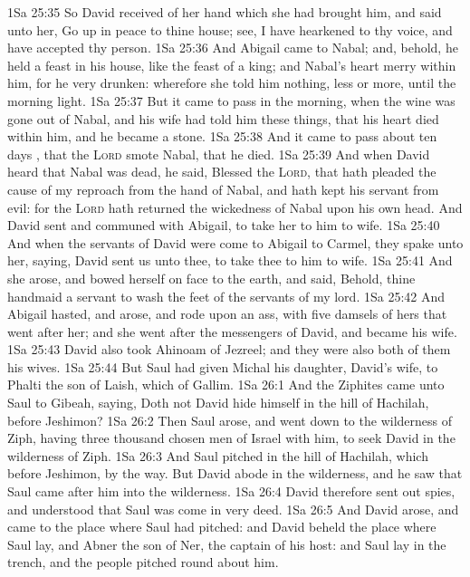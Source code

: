 \vs 1Sa 25:35 So David received of her hand  which she had brought him, and said unto her, Go up in peace to thine house; see, I have hearkened to thy voice, and have accepted thy person.
\vs 1Sa 25:36 And Abigail came to Nabal; and, behold, he held a feast in his house, like the feast of a king; and Nabal's heart  merry within him, for he  very drunken: wherefore she told him nothing, less or more, until the morning light.
\vs 1Sa 25:37 But it came to pass in the morning, when the wine was gone out of Nabal, and his wife had told him these things, that his heart died within him, and he became  a stone.
\vs 1Sa 25:38 And it came to pass about ten days , that the \textsc{Lord} smote Nabal, that he died.
\vs 1Sa 25:39 And when David heard that Nabal was dead, he said, Blessed  the \textsc{Lord}, that hath pleaded the cause of my reproach from the hand of Nabal, and hath kept his servant from evil: for the \textsc{Lord} hath returned the wickedness of Nabal upon his own head. And David sent and communed with Abigail, to take her to him to wife.
\vs 1Sa 25:40 And when the servants of David were come to Abigail to Carmel, they spake unto her, saying, David sent us unto thee, to take thee to him to wife.
\vs 1Sa 25:41 And she arose, and bowed herself on  face to the earth, and said, Behold,  thine handmaid  a servant to wash the feet of the servants of my lord.
\vs 1Sa 25:42 And Abigail hasted, and arose, and rode upon an ass, with five damsels of hers that went after her; and she went after the messengers of David, and became his wife.
\vs 1Sa 25:43 David also took Ahinoam of Jezreel; and they were also both of them his wives.
\vs 1Sa 25:44 But Saul had given Michal his daughter, David's wife, to Phalti the son of Laish, which  of Gallim.
\vs 1Sa 26:1 And the Ziphites came unto Saul to Gibeah, saying, Doth not David hide himself in the hill of Hachilah,  before Jeshimon?
\vs 1Sa 26:2 Then Saul arose, and went down to the wilderness of Ziph, having three thousand chosen men of Israel with him, to seek David in the wilderness of Ziph.
\vs 1Sa 26:3 And Saul pitched in the hill of Hachilah, which  before Jeshimon, by the way. But David abode in the wilderness, and he saw that Saul came after him into the wilderness.
\vs 1Sa 26:4 David therefore sent out spies, and understood that Saul was come in very deed.
\vs 1Sa 26:5 And David arose, and came to the place where Saul had pitched: and David beheld the place where Saul lay, and Abner the son of Ner, the captain of his host: and Saul lay in the trench, and the people pitched round about him.

